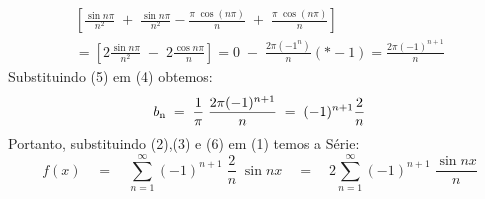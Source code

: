 \documentclass[12pt]{article}
\begin{document}
\begin{enumerate}[label=S.]
            \begin{equation}
            \begin{split}
            \left[\frac{\sin n\pi}{n^{2}}\;+\;\frac{\sin n\pi}{n^{2}}-\frac{\pi\; \cos (n\pi)}{n}\;+\;\frac{\pi\; \cos (n\pi)}{n}\right] \\
            = \left[2 \frac{\sin n\pi}{n^{2}}\;-\;2\frac{\cos n\pi}{n}\right] = 0 \;-\; \frac{2\pi (-1^{n})}{n}(*-1) =  \frac{2\pi (-1)^{n+1}}{n}
            \end{split}
            \end{equation}
            Substituindo (5) em (4) obtemos:
            \begin{equation}
            {b\textsubscript{n}} \;=\; \frac{1}{\pi} \; \frac{2\pi (-1)^{n+1}}{n} \;=\; (-1)^{n+1} \frac{2}{n}
            \end{equation}
            Portanto, substituindo (2),(3) e (6) em (1) temos a Série:
            \begin{equation}
            f(x) \quad=\quad \sum_{n=1}^{\infty} (-1)^{n+1} \; \frac{2}{n}\; \sin nx \quad=\quad 2 \sum_{n=1}^{\infty} (-1)^{n+1}\; \frac{\sin nx}{n}
            \end{equation}
        \end{enumerate}
\end{document}
